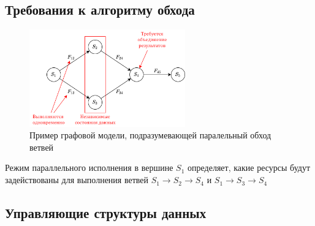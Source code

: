 \subsection{Требования к алгоритму обхода}
\begin{frame}
    \begin{figure}
        \centering
        \includegraphics[width=0.6\textwidth]{images/illustration.parallel_run.png}
        \caption{Пример графовой модели, подразумевающей паралельный обход ветвей}
    \end{figure}

    Режим параллельного исполнения в вершине $S_1$ определяет, какие ресурсы будут задействованы для выполнения ветвей $S_1 \to S_2 \to S_4$ и $S_1 \to S_3 \to S_4$
\end{frame}

\subsection{Управляющие структуры данных}
\begin{frame}


\end{frame}

